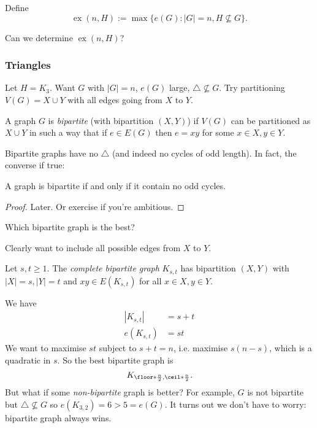 \documentclass[a4paper]{article}
\DeclareMathOperator{\exx}{ex} %
\begin{document}
\begin{definition}
  Define
  \[
    \exx(n,H) := \max\{ e(G): |G|=n, H \nsubseteq G\}.
  \]
\end{definition}

\begin{question}
  Can we determine \(\exx(n,H)\)?
\end{question}

\subsubsection{Triangles}

Let \(H = K_3\). Want \(G\) with \(|G| = n\), \(e(G)\) large, \(\triangle \nsubseteq G\). Try partitioning \(V(G) = X\cup Y\) with all edges going from \(X\) to \(Y\).

\begin{definition}
  A graph \(G\) is \emph{bipartite} (with bipartition \((X,Y)\)) if \(V(G)\) can be partitioned as \(X\cup Y\) in such a way that if \(e\in E(G)\) then \(e=xy\) for some \(x\in X, y\in Y\).
\end{definition}

Bipartite graphs have no \(\triangle\) (and indeed no cycles of odd length). In fact, the converse if true:

\begin{theorem}
  A graph is bipartite if and only if it contain no odd cycles.
\end{theorem}

\begin{proof}
  Later. Or exercise if you're ambitious.
\end{proof}

\begin{question}
  Which bipartite graph is the best?
\end{question}

Clearly want to include all possible edges from \(X\) to \(Y\).

\begin{definition}
  Let \(s,t\geq 1\). The \emph{complete bipartite graph} \(K_{s,t}\) has bipartition \((X,Y)\) with \(|X| = s, |Y| = t\) and \(xy \in E(K_{s,t})\) for all \(x\in X, y\in Y\).
\end{definition}

We have
\begin{align*}
  |K_{s,t}| &= s+t \\
  e(K_{s,t}) &= st
\end{align*}
We want to maximise \(st\) subject to \(s+t=n\), i.e. maximise \(s(n-s)\), which is a quadratic in \(s\). So the best bipartite graph is
\[
  K_{\floor*{\frac{n}{2}}, \ceil*{\frac{n}{2}}}.
\]
But what if some \emph{non-bipartite} graph is better? For example, \(G\) is not bipartite but \(\triangle \nsubseteq G\) so \(e(K_{3,2}) = 6 > 5 = e(G)\). It turns out we don't have to worry: bipartite graph always wins.
\end{document}
